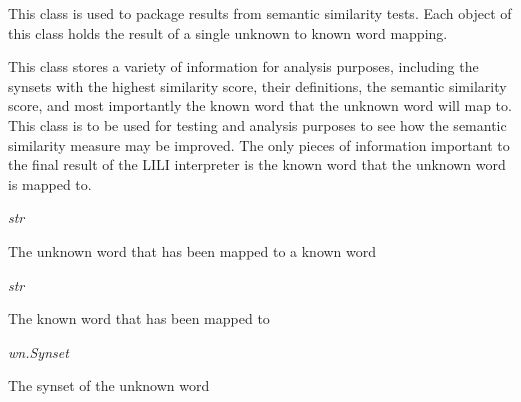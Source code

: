 \documentclass[letterpaper,10pt,english]{sphinxmanual}
\begin{document}
\begin{fulllineitems}
\label{wntest:semsim.wntest.SemanticSimilarityResult}
This class is used to package results from semantic similarity tests. Each object of this class holds the result of a single unknown to known word mapping.

This class stores a variety of information for analysis purposes, including the synsets with the highest similarity score, their definitions, the semantic similarity score, and most importantly the known word that the unknown word will map to. This class is to be used for testing and analysis purposes to see how the semantic similarity measure may be improved. The only pieces of information important to the final result of the LILI interpreter is the known word that the unknown word is mapped to.

\begin{fulllineitems}
\label{wntest:semsim.wntest.SemanticSimilarityResult.unknown}
\emph{str}

The unknown word that has been mapped to a known word

\end{fulllineitems}


\begin{fulllineitems}
\label{wntest:semsim.wntest.SemanticSimilarityResult.known}
\emph{str}

The known word that has been mapped to

\end{fulllineitems}


\begin{fulllineitems}
\label{wntest:semsim.wntest.SemanticSimilarityResult.unknown_synset}
\emph{wn.Synset}

The synset of the unknown word

\end{fulllineitems}


\end{fulllineitems}
\end{document}
